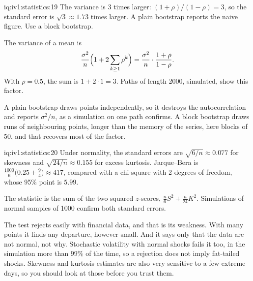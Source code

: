 \enlargethispage{-1\baselineskip}%
\begin{solution}{iq:iv1:statistics:19}
The variance is 3 times larger: $(1 + \rho)/(1 - \rho) = 3$, so the standard error is $\sqrt{3} \approx 1.73$ times larger. A plain bootstrap reports the naive figure. Use a block bootstrap.

The variance of a mean is
\[
\frac{\sigma^2}{n}\Bigl(1 + 2\sum_{k \ge 1} \rho^k\Bigr) = \frac{\sigma^2}{n} \cdot \frac{1 + \rho}{1 - \rho}.
\]
With $\rho = 0.5$, the sum is $1 + 2 \cdot 1 = 3$. Paths of length 2000, simulated, show this factor.

A plain bootstrap draws points independently, so it destroys the autocorrelation and reports $\sigma^2/n$, as a simulation on one path confirms. A block bootstrap draws runs of neighbouring points, longer than the memory of the series, here blocks of 50, and that recovers most of the factor.

\end{solution}

\begin{solution}{iq:iv1:statistics:20}
Under normality, the standard errors are $\sqrt{6/n} \approx 0.077$ for skewness and $\sqrt{24/n} \approx 0.155$ for excess kurtosis. Jarque--Bera is $\frac{1000}{6}\bigl(0.25 + \frac94\bigr) \approx 417$, compared with a chi-square with 2 degrees of freedom, whose 95\% point is $5.99$.

The statistic is the sum of the two squared $z$-scores, $\frac{n}{6}S^2 + \frac{n}{24}K^2$. Simulations of normal samples of 1000 confirm both standard errors.

The test rejects easily with financial data, and that is its weakness. With many points it finds any departure, however small. And it says only that the data are not normal, not why. Stochastic volatility with normal shocks fails it too, in the simulation more than 99\% of the time, so a rejection does not imply fat-tailed shocks. Skewness and kurtosis estimates are also very sensitive to a few extreme days, so you should look at those before you trust them.

\end{solution}

